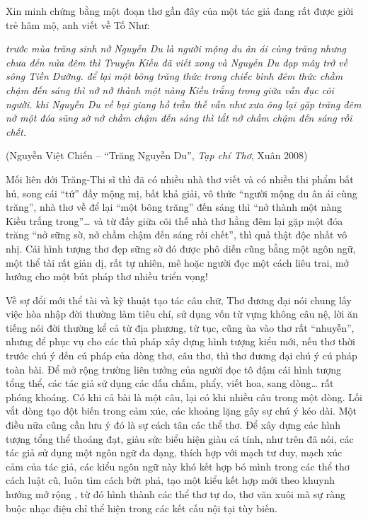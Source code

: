 \documentclass[../main.tex]{subfiles}
\begin{document}
\begin{multicols}{2}
Xin minh chứng bằng một đoạn thơ gần đây của một tác giả đang rất được giới trẻ hâm mộ, anh viết về Tố Như: 
\begin{blockquote}
 
	\textit{trước mùa trăng sinh nở } 
\textit{	Nguyễn Du là người mộng du ân ái cùng trăng} 
\textit{	nhưng chưa đến nửa đêm thì Truyện Kiều đã viết xong} 
\textit{	và Nguyễn Du đạp mây trở về sông Tiền Đường.} 
\textit{    	để lại một bông trăng thức trong chiếc bình đêm} 
\textit{	thức chầm chậm} 
\textit{	đến sáng thì nở} 
\textit{	nở thành một nàng Kiều trắng trong} 
\textit{	giữa vẫn đục cõi người. } 
\textit{    	khi Nguyễn Du về} 
\textit{	bụi giang hồ } 
\textit{	trần thế vẫn như xưa} 
\textit{	ông lại gặp trăng đêm} 
\textit{	nở một đóa sũng sờ} 
\textit{    	nở chầm chậm đến sáng thì tắt } 
\textit{                      	nở chầm chậm đến sáng rồi chết.} 
	 
		(Nguyễn Việt Chiến – “Trăng Nguyễn Du”, \textit{Tạp chí Thơ}, Xuân 2008) 
 \end{blockquote}
      
Mối liên đới Trăng-Thi sĩ thì đã có nhiều nhà thơ viết và có nhiều thi phẩm bất hủ, song cái “tứ” đầy mộng mị, bất khả giải, vô thức “người mộng du ân ái cùng trăng”, nhà thơ về để lại “một bông trăng” đến sáng thì “nở thành một nàng Kiều trắng trong”… và từ đấy giữa cõi thế nhà thơ  hằng đêm lại gặp một đóa trăng “nở sững sờ, nở chầm chậm đến sáng rồi chết”, thì quả thật độc nhất vô nhị. Cái hình tượng thơ đẹp sững sờ đó được phô diễn cũng bằng một ngôn ngữ, một thể tài rất giản dị, rất tự nhiên, mê hoặc người đọc một cách liêu trai, mở hướng cho một bút pháp thơ nhiều triển vọng! 
 
Về sự đổi mới thể tài và kỹ thuật tạo tác câu chữ, Thơ đương đại nói chung lấy việc hòa nhập đời thường làm tiêu chí, sử dụng vốn từ vựng không câu nệ, lời ăn tiếng nói đời thường kể cả từ địa phương, từ tục, cũng ùa vào thơ rất “nhuyễn”, nhưng để phục vụ cho các thủ pháp xây dựng hình tượng kiểu mới, nếu thơ thời trước chú ý đến cú pháp của dòng thơ, câu thơ, thì  thơ đương đại chú ý cú pháp toàn bài. Để mở rộng trường liên tưởng của người đọc tô đậm cái hình tượng tổng thể, các tác giả sử dụng các dấu chấm, phẩy, viết hoa, sang dòng… rất phóng khoáng. Có khi cả bài là một câu, lại có khi nhiều câu trong một dòng. Lối vắt dòng tạo đột biến trong cảm xúc, các khoảng lặng gây sự chú ý kéo dài. Một điều nữa cũng cần lưu ý đó là sự cách tân các thể thơ. Để xây dựng các hình tượng tổng thể thoáng đạt, giàu sức biểu hiện giàu cá tính, như trên đã nói, các tác giả sử dụng một ngôn ngữ đa dạng, thích hợp với mạch tư duy, mạch xúc cảm của tác giả, các kiểu ngôn ngữ này khó kết hợp bó mình trong các thể thơ cách luật cũ, luôn tìm cách bứt phá, tạo một kiểu kết hợp mới theo khuynh hướng mở rộng , từ đó hình thành các thể thơ tự do, thơ văn xuôi mà sự ràng buộc nhạc điệu chỉ thể hiện trong các kết cấu nội tại tùy biến.	 
  

\end{multicols}
\end{document}
